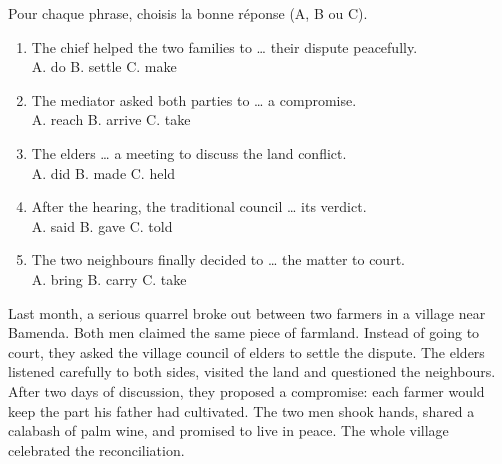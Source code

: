 \documentclass[11pt]{article}
\begin{document}
\begin{exercice}
Pour chaque phrase, choisis la bonne réponse (A, B ou C).

\begin{enumerate}
\item The chief helped the two families to \ldots{} their dispute peacefully.\\
A. do \hspace{1cm} B. settle \hspace{1cm} C. make
\item The mediator asked both parties to \ldots{} a compromise.\\
A. reach \hspace{1cm} B. arrive \hspace{1cm} C. take
\item The elders \ldots{} a meeting to discuss the land conflict.\\
A. did \hspace{1cm} B. made \hspace{1cm} C. held
\item After the hearing, the traditional council \ldots{} its verdict.\\
A. said \hspace{1cm} B. gave \hspace{1cm} C. told
\item The two neighbours finally decided to \ldots{} the matter to court.\\
A. bring \hspace{1cm} B. carry \hspace{1cm} C. take
\end{enumerate}
\end{exercice}

\begin{textebox}
Last month, a serious quarrel broke out between two farmers in a village near Bamenda. Both men claimed the same piece of farmland. Instead of going to court, they asked the village council of elders to settle the dispute. The elders listened carefully to both sides, visited the land and questioned the neighbours. After two days of discussion, they proposed a compromise: each farmer would keep the part his father had cultivated. The two men shook hands, shared a calabash of palm wine, and promised to live in peace. The whole village celebrated the reconciliation.
\end{textebox}
\end{document}
